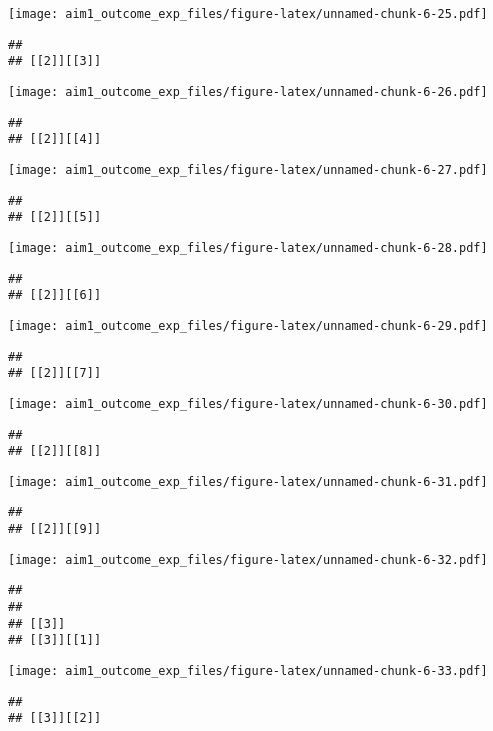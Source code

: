 \documentclass[
]{article}
\begin{document}
\texttt{[image: aim1\_outcome\_exp\_files/figure-latex/unnamed-chunk-6-25.pdf]}

\begin{verbatim}
## 
## [[2]][[3]]
\end{verbatim}

\texttt{[image: aim1\_outcome\_exp\_files/figure-latex/unnamed-chunk-6-26.pdf]}

\begin{verbatim}
## 
## [[2]][[4]]
\end{verbatim}

\texttt{[image: aim1\_outcome\_exp\_files/figure-latex/unnamed-chunk-6-27.pdf]}

\begin{verbatim}
## 
## [[2]][[5]]
\end{verbatim}

\texttt{[image: aim1\_outcome\_exp\_files/figure-latex/unnamed-chunk-6-28.pdf]}

\begin{verbatim}
## 
## [[2]][[6]]
\end{verbatim}

\texttt{[image: aim1\_outcome\_exp\_files/figure-latex/unnamed-chunk-6-29.pdf]}

\begin{verbatim}
## 
## [[2]][[7]]
\end{verbatim}

\texttt{[image: aim1\_outcome\_exp\_files/figure-latex/unnamed-chunk-6-30.pdf]}

\begin{verbatim}
## 
## [[2]][[8]]
\end{verbatim}

\texttt{[image: aim1\_outcome\_exp\_files/figure-latex/unnamed-chunk-6-31.pdf]}

\begin{verbatim}
## 
## [[2]][[9]]
\end{verbatim}

\texttt{[image: aim1\_outcome\_exp\_files/figure-latex/unnamed-chunk-6-32.pdf]}

\begin{verbatim}
## 
## 
## [[3]]
## [[3]][[1]]
\end{verbatim}

\texttt{[image: aim1\_outcome\_exp\_files/figure-latex/unnamed-chunk-6-33.pdf]}

\begin{verbatim}
## 
## [[3]][[2]]
\end{verbatim}
\end{document}
